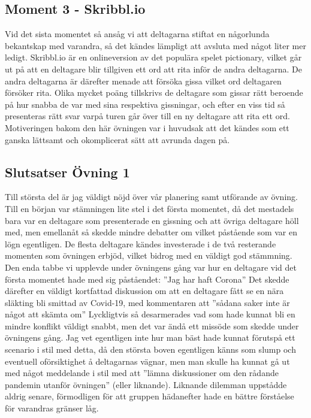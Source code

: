 \documentclass[a4paper, titlepage,12pt]{article}
\begin{document}
		\subsection{Moment 3 - Skribbl.io}
			Vid det sista momentet så ansåg vi att deltagarna stiftat en någorlunda bekantskap med varandra, så det kändes lämpligt att avsluta med något liter mer ledigt. Skribbl.io är en onlineversion av det populära spelet pictionary, vilket går ut på att en deltagare blir tillgiven ett ord att rita inför de andra deltagarna. De andra deltagarna är därefter menade att försöka gissa vilket ord deltagaren försöker rita. Olika mycket poäng tillskrivs de deltagare som gissar rätt beroende på hur snabba de var med sina respektiva gissningar, och efter en viss tid så presenteras rätt svar varpå turen går över till en ny deltagare att rita ett ord.\\

			Motiveringen bakom den här övningen var i huvudsak att det kändes som ett ganska lättsamt och okomplicerat sätt att avrunda dagen på.

		\subsection{Slutsatser Övning 1}
			Till största del är jag väldigt nöjd över vår planering samt utförande av övning. Till en början var stämningen lite stel i det första momentet, då det mestadels bara var en deltagare som presenterade en gissning och att övriga deltagare höll med, men emellanåt så skedde mindre debatter om vilket påstående som var en lögn egentligen. De flesta deltagare kändes investerade i de två resterande momenten som övningen erbjöd, vilket bidrog med en väldigt god stämmning. Den enda tabbe vi upplevde under övningens gång var hur en deltagare vid det första momentet hade med sig påståendet: ''Jag har haft Corona'' Det skedde därefter en väldigt kortfattad diskussion om att en deltagare fått se en nära släkting bli smittad av Covid-19, med kommentaren att ''sådana saker inte är något att skämta om'' Lyckligtvis så desarmerades vad som hade kunnat bli en mindre konflikt väldigt snabbt, men det var ändå ett missöde som skedde under övningens gång. Jag vet egentligen inte hur man bäst hade kunnat förutspå ett scenario i stil med detta, då den största boven egentligen känns som slump och eventuell oförsiktighet å deltagarnas vägnar, men man skulle ha kunnat gå ut med något meddelande i stil med att ''lämna diskussioner om den rådande pandemin utanför övningen'' (eller liknande). Liknande dilemman uppstådde aldrig senare, förmodligen för att gruppen hädanefter hade en bättre förståelse för varandras gränser låg.
\end{document}
